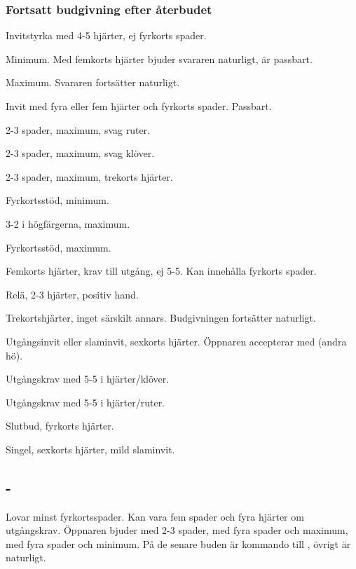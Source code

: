 \subsubsection{Fortsatt budgivning efter {\aa}terbudet }
 \bbe
   \item[-\spa{2}] Invitstyrka med 4-5 hj\"arter,
                   ej fyrkorts spader.
       \bbe
		\item[\NT{2}] Minimum. Med femkorts hj\"arter bjuder svararen
                              naturligt,  \"ar passbart.
                \item[\kl{3}] Maximum. Svararen forts\"atter naturligt.
      \ebe
   \item[-\NT{2}] Invit med fyra eller fem hj\"arter och fyrkorts spader.
                  Passbart.
      \bbe
          \item[\kl{3}] 2-3 spader, maximum, svag ruter. 
          \item[\ru{3}] 2-3 spader, maximum, svag kl\"over.
          \item[\hj{3}] 2-3 spader, maximum, trekorts hj\"arter.
          \item[\spa{3}] Fyrkortsst\"od, minimum.
          \item[\NT{3}] 3-2 i h\"ogf\"argerna, maximum.
          \item[\spa{4}] Fyrkortsst\"od, maximum.
      \ebe
   \item[-\kl{3}] Femkorts hj\"arter, krav till utg{\aa}ng, ej 5-5. Kan
innehålla fyrkorts spader.
      \bbe
		\item[\ru{3}] Rel\"a, 2-3 hj\"arter, positiv hand.
                \item[\hj{3}] Trekortshj\"arter, inget s\"arskilt annars.
      \ebe
          Budgivningen forts\"atter naturligt.
   \item[-\ru{3}] Utg{\aa}ngsinvit eller slaminvit, sexkorts hj\"arter.
                  Öppnaren accepterar med  (andra h\"o).
   \item[-\hj{3}] Utg{\aa}ngskrav med 5-5 i hj\"arter/kl\"over.
   \item[-\spa{3}] Utg{\aa}ngskrav med 5-5 i hj\"arter/ruter.
   \item[-\NT{3}] Slutbud, fyrkorts hj\"arter.
   \item[-\la{4}] Singel, sexkorts hj\"arter, mild slaminvit.
 \ebe

\subsection{ - }
Lovar minst fyrkortsspader. Kan vara fem spader och fyra hj\"arter om
ut\-g{\aa}ngs\-krav. Öppnaren bjuder 
 med 2-3 spader,  med fyra spader och maximum,  med fyra
spader och minimum. P{\aa} de senare buden \"ar  kommando till 
, \"ovrigt \"ar naturligt.

